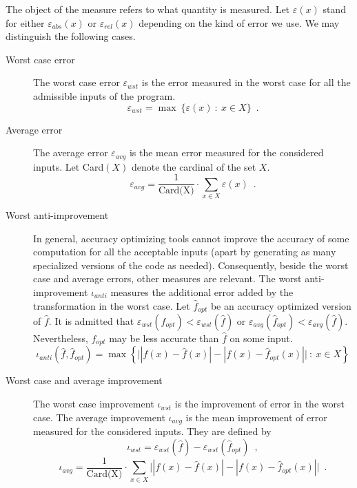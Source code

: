 \documentclass[main.tex]{subfiles}
\begin{document}
The object of the measure refers to what quantity is measured.  Let $\varepsilon(x)$
stand for either $\varepsilon_{abs}(x)$ or $\varepsilon_{rel}(x)$ depending on the kind of error we use. 
We may distinguish the following cases.
\begin{description}
\item[Worst case error] The worst case error $\varepsilon_{wst}$ is the error measured in the worst case for all the admissible inputs of the program. 
\begin{equation}
\varepsilon_{wst} = \max\ \big\{ \varepsilon(x)\ :\ x\in X \big\} \enspace .
\end{equation}
\item[Average error] The average error $\varepsilon_{avg}$ is the mean error measured for the considered inputs. Let Card$(X)$ denote
the cardinal of the set $X$.
 \begin{equation}
\varepsilon_{avg} = \frac{1}{\text{Card(X)}} \cdot \sum_{x\in X} \varepsilon(x) \enspace .
\end{equation}
\item[Worst anti-improvement] In general, accuracy optimizing tools cannot improve the accuracy of some computation for
all the acceptable inputs (apart by generating as many specialized versions of the code as needed). Consequently,
beside the worst case and average errors, other measures are relevant. The worst anti-improvement $\iota_{anti}$
measures the additional error added by the transformation in the worst case. Let $\hat{f}_{opt}$ be an accuracy optimized
version of $\hat{f}$. It is admitted that $\varepsilon_{wst}(\hat{f}_{opt})< \varepsilon_{wst}(\hat{f})$
or $\varepsilon_{avg}(\hat{f}_{opt})< \varepsilon_{avg}(\hat{f})$. Nevertheless, $\hat{f}_{opt}$ may be
less accurate than $\hat{f}$ on some input.
\begin{equation}
\iota_{anti}(\hat{f},\hat{f}_{opt}) = \max \left\{ \big| |f(x)-\hat{f}(x)| - |f(x)-\hat{f}_{opt}(x)|   
\big|\ :\ x\in X\right\}
\end{equation}
\item[Worst case and average improvement] The worst case improvement $\iota_{wst}$ is the improvement of error in the worst case. The average improvement $\iota_{avg}$ is the mean improvement of error measured 
for the considered inputs.  They are defined by
 \begin{equation}
\iota_{wst} = \varepsilon_{wst}(\hat{f}) - \varepsilon_{wst}(\hat{f}_{opt})\enspace,
\end{equation}
 \begin{equation}
\iota_{avg} = \frac{1}{\text{Card(X)}} \cdot \sum_{x\in X}  \big| |f(x)-\hat{f}(x)| - |f(x)-\hat{f}_{opt}(x)|  \big|\enspace .
\end{equation}
\end{description}
\end{document}
